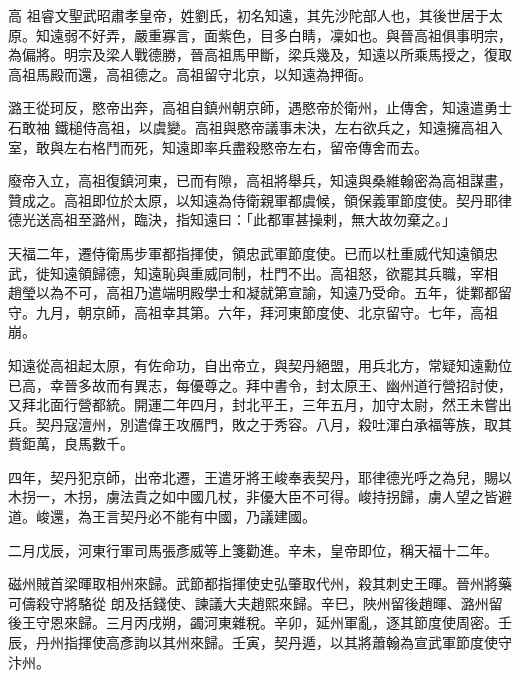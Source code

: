 
\begin{pinyinscope}

 高
 祖睿文聖武昭肅孝皇帝，姓劉氏，初名知遠，其先沙陀部人也，其後世居于太原。知遠弱不好弄，嚴重寡言，面紫色，目多白睛，凜如也。與晉高祖俱事明宗，為偏將。明宗及梁人戰德勝，晉高祖馬甲斷，梁兵幾及，知遠以所乘馬授之，復取高祖馬殿而還，高祖德之。高祖留守北京，以知遠為押衙。



 潞王從珂反，愍帝出奔，高祖自鎮州朝京師，遇愍帝於衛州，止傳舍，知遠遣勇士石敢袖
 鐵槌侍高祖，以虞變。高祖與愍帝議事未決，左右欲兵之，知遠擁高祖入室，敢與左右格鬥而死，知遠即率兵盡殺愍帝左右，留帝傳舍而去。



 廢帝入立，高祖復鎮河東，已而有隙，高祖將舉兵，知遠與桑維翰密為高祖謀畫，贊成之。高祖即位於太原，以知遠為侍衛親軍都虞候，領保義軍節度使。契丹耶律德光送高祖至潞州，臨決，指知遠曰：「此都軍甚操剌，無大故勿棄之。」



 天福二年，遷侍衛馬步軍都指揮使，領忠武軍節度使。已而以杜重威代知遠領忠武，徙知遠領歸德，知遠恥與重威同制，杜門不出。高祖怒，欲罷其兵職，宰相
 趙瑩以為不可，高祖乃遣端明殿學士和凝就第宣諭，知遠乃受命。五年，徙鄴都留守。九月，朝京師，高祖幸其第。六年，拜河東節度使、北京留守。七年，高祖崩。



 知遠從高祖起太原，有佐命功，自出帝立，與契丹絕盟，用兵北方，常疑知遠勳位已高，幸晉多故而有異志，每優尊之。拜中書令，封太原王、幽州道行營招討使，又拜北面行營都統。開運二年四月，封北平王，三年五月，加守太尉，然王未嘗出兵。契丹寇澶州，別遣偉王攻鴈門，敗之于秀容。八月，殺吐渾白承福等族，取其貲鉅萬，良馬數千。



 四年，契丹犯京師，出帝北遷，王遣牙將王峻奉表契丹，耶律德光呼之為兒，賜以木拐一，木拐，虜法貴之如中國几杖，非優大臣不可得。峻持拐歸，虜人望之皆避道。峻還，為王言契丹必不能有中國，乃議建國。



 二月戊辰，河東行軍司馬張彥威等上箋勸進。辛未，皇帝即位，稱天福十二年。



 磁州賊首梁暉取相州來歸。武節都指揮使史弘肇取代州，殺其刺史王暉。晉州將藥可儔殺守將駱從
 朗及括錢使、諫議大夫趙熙來歸。辛巳，陜州留後趙暉、潞州留後王守恩來歸。三月丙戌朔，蠲河東雜稅。辛卯，延州軍亂，逐其節度使周密。壬辰，丹州指揮使高彥詢以其州來歸。壬寅，契丹遁，以其將蕭翰為宣武軍節度使守汴州。




\end{pinyinscope}
